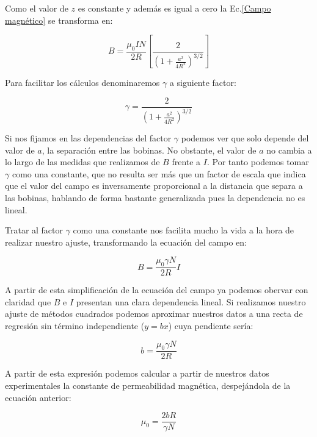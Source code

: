 \documentclass[a4paper,12pt,titlepage]{report}
\begin{document}
\par Como el valor de $z$ es constante y además es igual a cero la Ec.\ref{Campo magnético} se transforma en:

\begin{equation}
    B=\frac{\mu_0 I N}{2 R}\left[\frac{2}{\left(1+\frac{a^2}{4R^2}\right)^{3 / 2}}\right]
\end{equation}

Para facilitar los cálculos denominaremos $\gamma$ a siguiente factor:

\begin{equation}
    \gamma = \frac{2}{\left(1+\frac{a^2}{4R^2}\right)^{3 / 2}}
    \label{Factor gamma}
\end{equation}

Si nos fijamos en las dependencias del factor $\gamma$ podemos ver que solo depende del valor de $a$, la separación entre las bobinas. No obstante, el valor de $a$ no cambia a lo largo de las medidas que realizamos de $B$ frente a $I$. Por tanto podemos tomar $\gamma$ como una constante, que no resulta ser más que un factor de escala que indica que el valor del campo es inversamente proporcional a la distancia que separa a las bobinas, hablando de forma bastante generalizada pues la dependencia no es lineal.

\par Tratar al factor $\gamma$ como una constante nos facilita mucho la vida a la hora de realizar nuestro ajuste, transformando la ecuación del campo en:

\begin{equation}
    B=\frac{\mu_0 \gamma N}{2 R} I
    \label{Ec campo reducida}
\end{equation}

A partir de esta simplificación de la ecuación del campo ya podemos obervar con claridad que $B$ e $I$ presentan una clara dependencia lineal. Si realizamos nuestro ajuste de métodos cuadrados podemos aproximar nuestros datos a una recta de regresión sin término independiente ($y=bx$) cuya pendiente sería:

\begin{equation}
    b = \frac{\mu_0 \gamma N}{2 R}
\end{equation}

A partir de esta expresión podemos calcular a partir de nuestros datos experimentales la constante de permeabilidad magnética, despejándola de la ecuación anterior:

\begin{equation}
    \mu_0 = \frac{2bR}{\gamma N}
    \label{Permeabilidad magnética}
\end{equation}
\end{document}
